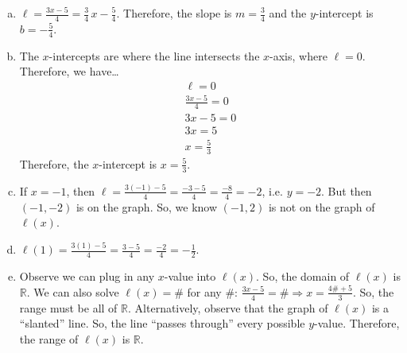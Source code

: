 \documentclass[11pt,letterpaper]{article}
\begin{document}
\sol 
{\itshape
\begin{enumerate}[(a)]
\item $\ell= \tfrac{3x - 5}{4}= \tfrac{3}{4}\,x - \tfrac{5}{4}$. Therefore, the slope is $m= \tfrac{3}{4}$ and the $y$-intercept is $b= -\tfrac{5}{4}$. 

\item The $x$-intercepts are where the line intersects the $x$-axis, where $\ell= 0$. Therefore, we have\dots
	\[
	\begin{gathered}
	\ell= 0 \\
	\tfrac{3x - 5}{4}= 0 \\
	3x - 5= 0 \\
	3x= 5 \\
	x= \tfrac{5}{3}
	\end{gathered}
	\]
Therefore, the $x$-intercept is $x= \tfrac{5}{3}$.

\item If $x= -1$, then $\ell= \tfrac{3(-1) - 5}{4}= \tfrac{-3 - 5}{4}= \tfrac{-8}{4}= -2$, i.e. $y= -2$. But then $(-1, -2)$ is on the graph. So, we know $(-1, 2)$ is not on the graph of $\ell(x)$.

\item $\ell(1)= \tfrac{3(1) - 5}{4}= \tfrac{3 - 5}{4}= \tfrac{-2}{4}= -\tfrac{1}{2}$.

\item Observe we can plug in any $x$-value into $\ell(x)$. So, the domain of $\ell(x)$ is $\mathbb{R}$. We can also solve $\ell(x)= \#$ for any $\#$: $\tfrac{3x - 5}{4}= \# \Longrightarrow x= \tfrac{4\# + 5}{3}$. So, the range must be all of $\mathbb{R}$. Alternatively, observe that the graph of $\ell(x)$ is a ``slanted'' line. So, the line ``passes through'' every possible $y$-value. Therefore, the range of $\ell(x)$ is $\mathbb{R}$.
\end{enumerate}
}

\vfill
\end{document}
